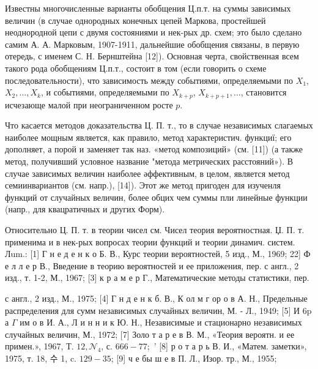 \documentclass[10pt]{article}
\begin{document}
Известны многочисленные варианты обобщения Ц.п.т. на суммы зависимых величин (в случае однородных конечных цепей Маркова, простейшей неоднородной цепи с двумя состояниями и нек-рых др. схем; это было сделано самим А. А. Марковым, 1907-1911, дальнейшие обобщения связаны, в первую отередь, с именем С. Н. Бернштейна [12]). Основная черта, свойственная всем такого рода обобщениям Ц.п.т., состоит в том (если говорить о схеме последовательности), что зависимость между событиями, определяемыми по $X_{1}$, $X_{2}, \ldots, X_{k}$, и событиями, определяемыми по $X_{k+p}$, $X_{k+p+1}, \ldots$, становится исчезающе малой при неограниченном росте $p$.



Что касается методов доказательства Ц. П. т., то в случае независимых слагаемых наиболее мощным является, как правило, метод характеристич. функциї; его дополняет, а порой и заменяет так наз. «метод композиций» (см. [11]) (а также метод, получивший условное название "метода метрических расстояний»). В случае зависимых величин наиболее әффективным, в целом, является метод семиинвариантов (см. напр.), [14]). Этот же метод пригоден для изученля функций от случайных величин, более обцих чем суммы пли линейные функции (напр., для квацратичных и других Форм).



Относительно Ц. П. т. в теории чисел см. Чисел теория вероятностная. Џ. П. т. применима и в нек-рых вопросах теории функций и теории динамич. систем. Лum.: [1] Г н е д е н к о Б. В., Курс теории вероятностей, 5 изд., М., 1969; 22] Ф е л л е р В., Введение в теорию вероятностей и ее приложения, пер. с англ., 2 изд., т. 1-2, М., 1967; [3] к р а м е р Г., Математические методы статистики, пер.

с англ., 2 изд., М., 1975; [4] Г н д е н к б. В., К ол м г ор о в А. Н., Предельные распределения для сумм независимых случайных величин, М. - Л., 1949; [5] И $6 \mathrm{p}$ а $\Gamma$ им о в И. А., Л и н н и к Ю. Н., Независимые и стационарно независимых случайных величин, М., 1972; [7] Золо т а р е в В. М., «Теория вероятн. и ее примен.», 1967, Т. $12, \mathcal{N}_{4}$, с. $666-77 ;$ ' [8] р о т а р ь В. И., «Матем. заметки», 1975, т. 18, 수 1, c. $129-35$; [9] ч е бы ш е в П. Л., Изор. тр., М., 1955;
\end{document}
